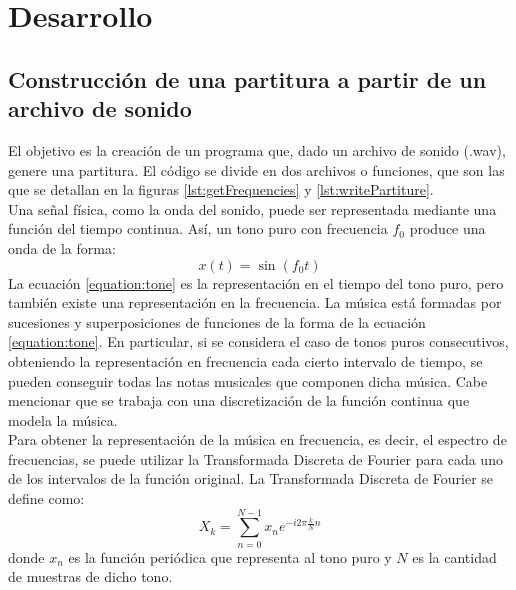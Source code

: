 \documentclass[journal, monochrome]{IEEEtran}
\begin{document}
\vspace{1cm}
\section{Desarrollo}
\label{section:development}
\vspace{0.5cm}
\subsection{Construcción de una partitura a partir de un archivo de sonido}
\label{subsection:partitureToWav}
El objetivo es la creación de un programa que, dado un archivo de sonido (.wav), genere una partitura. El código se divide en dos archivos o funciones, que son las que se detallan en la figuras \ref{lst:getFrequencies} y \ref{lst:writePartiture}. \\

Una señal física, como la onda del sonido, puede ser representada mediante una función del tiempo continua. Así, un tono puro con frecuencia $f_{0}$ produce una onda de la forma:
\begin{equation}
x(t) = \sin(f_{0}t)
\label{equation:tone}
\end{equation}
La ecuación \eqref{equation:tone} es la representación en el tiempo del tono puro, pero también existe una representación en la frecuencia. La música está formadas por sucesiones y superposiciones de funciones de la forma de la ecuación \eqref{equation:tone}. En particular, si se considera el caso de tonos puros consecutivos, obteniendo la representación en frecuencia cada cierto intervalo de tiempo, se pueden conseguir todas las notas musicales que componen dicha música. Cabe mencionar que se trabaja con una discretización de la función continua que modela la música. \\

Para obtener la representación de la música en frecuencia, es decir, el espectro de frecuencias, se puede utilizar la Transformada Discreta de Fourier para cada uno de los intervalos de la función original. La Transformada Discreta de Fourier \citep{mathews} se define como:
\begin{equation}
X_{k} = \sum_{n=0}^{N-1}x_{n}e^{-i2\pi\frac{k}{N}n}
\end{equation}
donde $x_{n}$ es la función periódica que representa al tono puro y $N$ es la cantidad de muestras de dicho tono.\\
\end{document}

